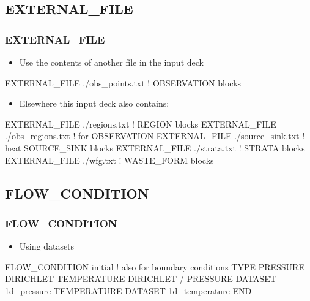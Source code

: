\documentclass{beamer}
\newcommand\bluecomment[1]{{{\color{blue} #1}}}
\begin{document}
\subsection{EXTERNAL\_FILE}

\begin{frame}[fragile]\frametitle{EXTERNAL\_FILE}
\begin{itemize}
  \item Use the contents of another file in the input deck
\end{itemize}

\begin{semiverbatim}
EXTERNAL_FILE ./obs_points.txt \bluecomment{! OBSERVATION blocks}
\end{semiverbatim}

\begin{itemize}
  \item Elsewhere this input deck also contains:
\end{itemize}

\begin{semiverbatim}
EXTERNAL_FILE ./regions.txt \bluecomment{! REGION blocks}
EXTERNAL_FILE ./obs_regions.txt \bluecomment{! for OBSERVATION} 
EXTERNAL_FILE ./source_sink.txt \bluecomment{! heat SOURCE_SINK blocks}
EXTERNAL_FILE ./strata.txt \bluecomment{! STRATA blocks}
EXTERNAL_FILE ./wfg.txt \bluecomment{! WASTE_FORM blocks}
\end{semiverbatim}

\end{frame}

\subsection{FLOW\_CONDITION}

\begin{frame}[fragile]\frametitle{FLOW\_CONDITION}
\begin{itemize}
  \item{Using datasets}
\end{itemize}

\begin{semiverbatim}
FLOW_CONDITION initial \bluecomment{! also for boundary conditions}
  TYPE
    PRESSURE DIRICHLET
    TEMPERATURE DIRICHLET
  /
  PRESSURE DATASET 1d_pressure
  TEMPERATURE DATASET 1d_temperature
END

\end{semiverbatim}
\end{frame}
\end{document}
